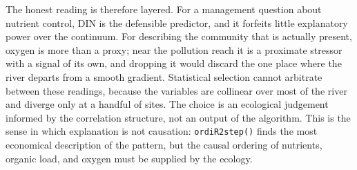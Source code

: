 \documentclass[11pt]{article}
\begin{document}
\begin{table}[!h]
\centering
\caption{\label{tab:tab:enrich-cor}Pearson correlations among distance from source and the enrichment variables across the 29 matched sites. The tight cluster among oxygen, biological oxygen demand, nitrate, ammonium, and phosphate is the collinearity that makes them substitutable along the continuum.}
\centering
{}
\end{table}
The honest reading is therefore layered. For a management question about nutrient control, DIN is the defensible predictor, and it forfeits little explanatory power over the continuum. For describing the community that is actually present, oxygen is more than a proxy; near the pollution reach it is a proximate stressor with a signal of its own, and dropping it would discard the one place where the river departs from a smooth gradient. Statistical selection cannot arbitrate between these readings, because the variables are collinear over most of the river and diverge only at a handful of sites. The choice is an ecological judgement informed by the correlation structure, not an output of the algorithm. This is the sense in which explanation is not causation: \texttt{ordiR2step()} finds the most economical description of the pattern, but the causal ordering of nutrients, organic load, and oxygen must be supplied by the ecology.
\end{document}
